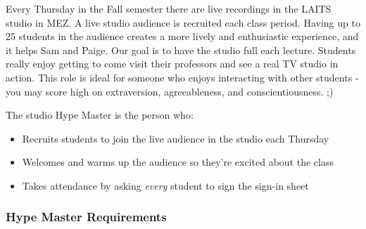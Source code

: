 \documentclass[
]{article}
\providecommand{\tightlist}{%
  \setlength{\itemsep}{0pt}\setlength{\parskip}{0pt}}
\begin{document}
Every Thursday in the Fall semester there are live recordings in the LAITS studio in MEZ. A live studio audience is recruited each class period. Having up to 25 students in the audience creates a more lively and enthusiastic experience, and it helps Sam and Paige. Our goal is to have the studio full each lecture. Students really enjoy getting to come visit their professors and see a real TV studio in action. This role is ideal for someone who enjoys interacting with other students - you may score high on extraversion, agreeableness, and conscientiousness. ;)

The studio Hype Master is the person who:

\begin{itemize}
\tightlist
\item
  Recruits students to join the live audience in the studio each Thursday
\item
  Welcomes and warms up the audience so they're excited about the class
\item
  Takes attendance by asking \emph{every} student to sign the sign-in sheet
\end{itemize}

\hypertarget{hype-master-requirements}{%
\subsubsection{Hype Master Requirements}\label{hype-master-requirements}}
\end{document}
